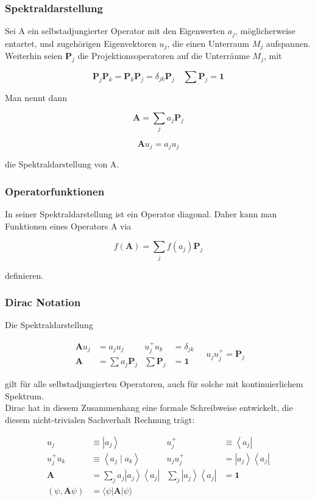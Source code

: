 \documentclass[10pt, letterpaper]{article}
\begin{document}
\subsubsection*{Spektraldarstellung}
Sei A ein selbstadjungierter Operator mit den Eigenwerten $a_{j}$, möglicherweise entartet, und zugehörigen Eigenvektoren $u_{j}$, die einen Unterraum $M_{j}$ aufspannen. Weiterhin seien $\mathbf{P}_{j}$ die Projektionsoperatoren auf die Unterräume $M_{j}$, mit

$$
\mathbf{P}_{j} \mathbf{P}_{k}=\mathbf{P}_{k} \mathbf{P}_{j}=\delta_{j k} \mathbf{P}_{j} \quad \sum \mathbf{P}_{j}=\mathbf{1}
$$

Man nennt dann

$$
\mathbf{A}=\sum_{j} a_{j} \mathbf{P}_{j}
$$

$$
\mathbf{A} u_{j}=a_{j} u_{j}
$$

die Spektraldarstellung von A.

\subsubsection*{Operatorfunktionen}
In seiner Spektraldarstellung ist ein Operator diagonal. Daher kann man Funktionen eines Operators A via

$$
f(\mathbf{A})=\sum_{j} f\left(a_{j}\right) \mathbf{P}_{j}
$$

definieren.







\subsubsection*{Dirac Notation}
Die Spektraldarstellung

$$
\begin{aligned}
\mathbf{A} u_{j} & =a_{j} u_{j} & u_{j}^{+} u_{k} & =\delta_{j k} \\
\mathbf{A} & =\sum a_{j} \mathbf{P}_{j} & \sum \mathbf{P}_{j} & =\mathbf{1}
\end{aligned} \quad u_{j} u_{j}^{+}=\mathbf{P}_{j}
$$

gilt für alle selbstadjungierten Operatoren, auch für solche mit kontinuierlichem Spektrum.\\
Dirac hat in diesem Zusammenhang eine formale Schreibweise entwickelt, die diesem nicht-trivialen Sachverhalt Rechnung trägt:

$$
\begin{aligned}
u_{j} & \equiv\left|a_{j}\right\rangle & u_{j}^{+} & \equiv\left\langle a_{j}\right| \\
u_{j}^{+} u_{k} & \equiv\left\langle a_{j} \mid a_{k}\right\rangle & u_{j} u_{j}^{+} & =\left|a_{j}\right\rangle\left\langle a_{j}\right| \\
\mathbf{A} & =\sum_{j} a_{j}\left|a_{j}\right\rangle\left\langle a_{j}\right| & \sum_{j}\left|a_{j}\right\rangle\left\langle a_{j}\right| & =\mathbf{1} \\
(\psi, \mathbf{A} \psi) & =\langle\psi| \mathbf{A}|\psi\rangle & &
\end{aligned}
$$
\end{document}
